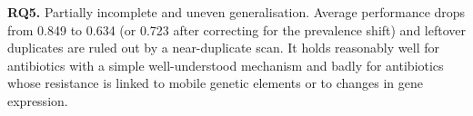 \textbf{RQ5.} Partially incomplete and uneven generalisation. Average performance drops from 0.849
to 0.634 (or 0.723 after correcting for the prevalence shift) and leftover duplicates are ruled out
by a near-duplicate scan. It holds reasonably well for antibiotics with a simple well-understood
mechanism and badly for antibiotics whose resistance is linked to mobile genetic elements or to
changes in gene expression.

